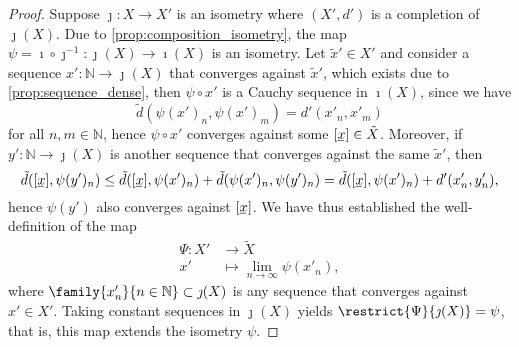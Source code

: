 \begin{proof}
    Suppose \(\jmath : X \to X'\) is an isometry where \((X', d')\) is a completion of \(\jmath(X)\). Due to \cref{prop:composition_isometry}, the map \(\psi = \imath \circ \jmath^{-1} : \jmath(X) \to \imath(X)\) is an isometry. Let \(\tilde{x}' \in X'\) and consider a sequence \(x' : \mathbb{N} \to \jmath(X)\) that converges against \(\tilde{x}'\), which exists due to \cref{prop:sequence_dense}, then \(\psi \circ x'\) is a Cauchy sequence in \(\imath(X)\), since we have
    \begin{equation*}
        \tilde{d}(\psi(x')_n, \psi(x')_m) = d'(x'_n, x'_m)
    \end{equation*}
    for all \(n,m \in \mathbb{N}\), hence \(\psi \circ x'\) converges against some \([\sequnder{x}] \in \tilde{X}\). Moreover, if \(y' : \mathbb{N} \to \jmath(X)\) is another sequence that converges against the same \(\tilde{x}'\), then
    \begin{equation*}
        \tilde{d}([\sequnder{x}], \psi(y')_n) \leq \tilde{d}([\sequnder{x}], \psi(x')_n) + \tilde{d}(\psi(x')_n, \psi(y')_n) = \tilde{d}([\sequnder{x}], \psi(x')_n) + d'(x'_n, y'_n),
    \end{equation*}
    hence \(\psi(y')\) also converges against \([\sequnder{x}]\). We have thus established the well-definition of the map
    \begin{align*}
        \Psi : X' &\to \tilde{X}\\
               x' &\mapsto \lim_{n\to\infty}{\psi(x'_n)},
    \end{align*}
    where \(\family{x'_n}{n \in \mathbb{N}}\subset \jmath(X)\) is any sequence that converges against \(x' \in X'\). Taking constant sequences in \(\jmath(X)\) yields \(\restrict{\Psi}{\jmath(X)} = \psi\), that is, this map extends the isometry \(\psi\). 


\end{proof}
